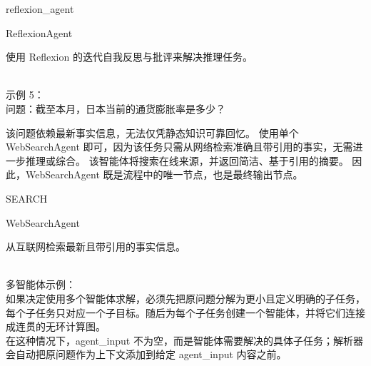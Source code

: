 \begin{userprompt}[title={用户提示词}]
\quad{}reflexion\_agent

\quad{}ReflexionAgent

\quad{}
使用 Reflexion 的迭代自我反思与批评来解决推理任务。

\quad{}

\qquad{}

\quad{}

\\

示例 5：\\

问题：截至本月，日本当前的通货膨胀率是多少？\\


该问题依赖最新事实信息，无法仅凭静态知识可靠回忆。
使用单个 WebSearchAgent 即可，因为该任务只需从网络检索准确且带引用的事实，无需进一步推理或综合。
该智能体将搜索在线来源，并返回简洁、基于引用的摘要。
因此，WebSearchAgent 既是流程中的唯一节点，也是最终输出节点。



\quad{}SEARCH

\quad{}WebSearchAgent

\quad{}
从互联网检索最新且带引用的事实信息。

\quad{}

\qquad{}

\quad{}

\\

多智能体示例：\\

如果决定使用多个智能体求解，必须先把原问题分解为更小且定义明确的子任务，每个子任务只对应一个子目标。随后为每个子任务创建一个智能体，并将它们连接成连贯的无环计算图。\\

在这种情况下，agent\_input 不为空，而是智能体需要解决的具体子任务；解析器会自动把原问题作为上下文添加到给定 agent\_input 内容之前。\\


\end{userprompt}

